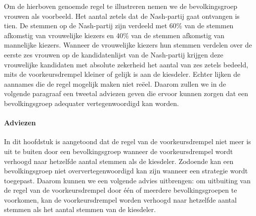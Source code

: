 Om de hierboven genoemde regel te illustreren nemen we de bevolkingsgroep vrouwen als voorbeeld. Het aantal zetels dat de Nash-partij gaat ontvangen is tien. De stemmen op de Nash-partij zijn verdeeld met 60\% van de stemmen afkomstig van vrouwelijke kiezers en 40\% van de stemmen afkomstig van mannelijke kiezers. Wanneer de vrouwelijke kiezers hun stemmen verdelen over de eerste zes vrouwen op de kandidatenlijst van de Nash-partij krijgen deze vrouwelijke kandidaten met absolute zekerheid het aantal van zes zetels bedeeld, mits de voorkeursdrempel kleiner of gelijk is aan de kiesdeler. Echter lijken de aannames die de regel mogelijk maken niet re\"{e}el. Daarom zullen we in de volgende paragraaf een tweetal adviezen geven die ervoor kunnen zorgen dat een bevolkingsgroep adequater vertegenwoordigd kan worden.

\paragraph*{Adviezen}
In dit hoofdstuk is aangetoond dat de regel van de voorkeursdrempel niet meer is uit te buiten door een bevolkingsgroep wanneer de voorkeursdrempel wordt verhoogd naar hetzelfde aantal stemmen als de kiesdeler. Zodoende kan een bevolkingsgroep niet oververtegenwoordigd kan zijn wanneer een strategie wordt toegepast. Daarom kunnen we een volgende advies uitbrengen: om uitbuiting van de regel van de voorkeursdrempel door één of meerdere bevolkingsgroepen te voorkomen, kan de voorkeursdrempel worden verhoogd naar hetzelfde aantal stemmen als het aantal stemmen van de kiesdeler. 

